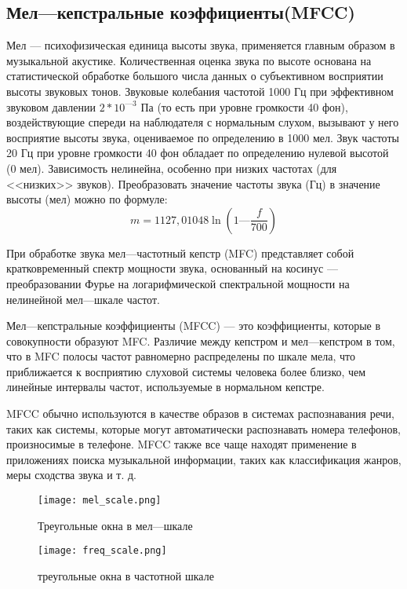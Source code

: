 \subsection{Мел—кепстральные коэффициенты(MFCC)}
\label{sub:domain:overview_mffc}
Мел — психофизическая единица высоты звука, применяется
главным образом в музыкальной акустике. Количественная оценка звука по высоте основана на статистической обработке большого числа данных о субъективном восприятии высоты звуковых тонов. Звуковые колебания частотой 1000 Гц при эффективном звуковом давлении $2 * 10 ^{—3} $ Па (то есть при уровне громкости 40 фон), воздействующие спереди на наблюдателя с нормальным слухом, вызывают у него восприятие высоты звука, оцениваемое по определению в 1000 мел. Звук частоты 20 Гц при уровне громкости 40 фон обладает по определению нулевой высотой (0 мел). Зависимость нелинейна, особенно при низких частотах (для <<низких>> звуков). Преобразовать значение частоты звука (Гц) в значение высоты (мел) можно по формуле:
\begin{equation}\label{eq:mel}
m = 1127,01048 \ln(1 — \frac{f}{700})
\end{equation}

При обработке звука мел—частотный кепстр (MFC) представляет собой кратковременный спектр мощности звука, основанный на косинус — преобразовании Фурье на логарифмической спектральной мощности  на нелинейной мел—шкале частот.

Мел—кепстральные коэффициенты (MFCC) — это коэффициенты, которые в совокупности образуют MFC. Различие между кепстром и мел—кепстром в том, что в MFC полосы частот равномерно распределены по шкале мела, что приближается к восприятию слуховой системы человека более близко, чем линейные интервалы частот, используемые в нормальном кепстре.

MFCC обычно используются в качестве образов в системах распознавания речи, таких как системы, которые могут автоматически распознавать номера телефонов, произносимые в телефоне. MFCC также все чаще находят применение в приложениях поиска музыкальной информации, таких как классификация жанров\cite{mfcc2}, меры сходства звука\cite{mfcc1} и т. д.
\begin{figure}
\centering
  \texttt{[image: mel\_scale.png]}
  \caption{Треугольные окна в мел—шкале}
  \label{fig:domain:mel_scale}
\end{figure}
\begin{figure}
\centering
  \texttt{[image: freq\_scale.png]}
  \caption{треугольные окна в частотной шкале}
  \label{fig:domain:freq_scale}
\end{figure}


